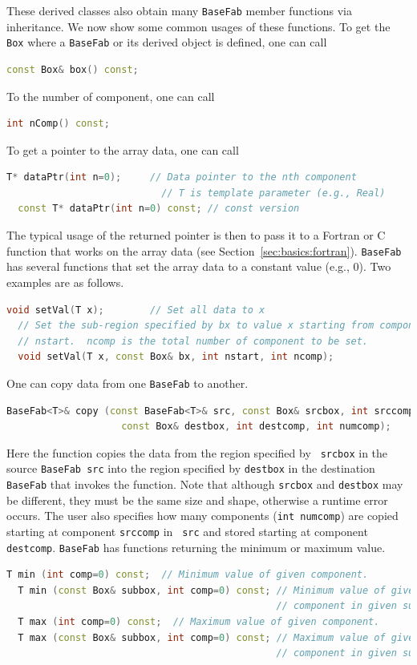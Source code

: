 {These derived classes also obtain many {\tt BaseFab} member functions
via inheritance.  We now show some common usages of these functions.
To get the {\tt Box} where a {\tt BaseFab} or its derived object is
defined, one can call
\begin{lstlisting}[language=cpp]
  const Box& box() const;
\end{lstlisting}
To the number of component, one can call
\begin{lstlisting}[language=cpp]
  int nComp() const;
\end{lstlisting}
To get a pointer to the array data, one can call
\begin{lstlisting}[language=cpp]
  T* dataPtr(int n=0);     // Data pointer to the nth component
                           // T is template parameter (e.g., Real)
  const T* dataPtr(int n=0) const; // const version
\end{lstlisting}
The typical usage of the returned pointer is then to pass it to a
Fortran or C function that works on the array data (see
Section~\ref{sec:basics:fortran}).
{\tt BaseFab} has several functions that set the array data to a
constant value (e.g., 0).  Two examples are as follows.  
\begin{lstlisting}[language=cpp]
  void setVal(T x);        // Set all data to x
  // Set the sub-region specified by bx to value x starting from component
  // nstart.  ncomp is the total number of component to be set.
  void setVal(T x, const Box& bx, int nstart, int ncomp);
\end{lstlisting}
One can copy data from one {\tt BaseFab} to another.
\begin{lstlisting}[language=cpp]
  BaseFab<T>& copy (const BaseFab<T>& src, const Box& srcbox, int srccomp,
                    const Box& destbox, int destcomp, int numcomp);
\end{lstlisting}
Here the function copies the data from the region specified by {\tt
  srcbox} in the source {\tt BaseFab src} into the region specified by
{\tt destbox} in the destination {\tt BaseFab} that invokes the
function.  Note that although {\tt srcbox} and {\tt destbox} may be
different, they must be the same size and shape, otherwise a runtime
error occurs.  The user also specifies how many components ({\tt int
  numcomp}) are copied starting at component {\tt srccomp} in {\tt
  src} and stored starting at component {\tt destcomp}.  {\tt BaseFab}
has functions returning the minimum or maximum value.
\begin{lstlisting}[language=cpp] 
  T min (int comp=0) const;  // Minimum value of given component.
  T min (const Box& subbox, int comp=0) const; // Minimum value of given 
                                               // component in given subbox.
  T max (int comp=0) const;  // Maximum value of given component.
  T max (const Box& subbox, int comp=0) const; // Maximum value of given 
                                               // component in given subbox.
\end{lstlisting}

}
